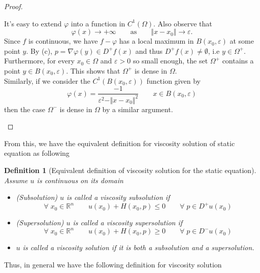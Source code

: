 \documentclass[12pt, oneside]{amsart}  	%
\newtheorem{definition}{Definition}
\begin{document}
\begin{proof}
\begin{itemize}
It's easy to extend $\varphi$ into a function in $C^1(\Omega)$. Also observe that 
\begin{equation*}
\varphi(x) \longrightarrow +\infty \qquad\text{as}\qquad \Vert x-x_0\Vert\longrightarrow \varepsilon.
\end{equation*}
Since $f$ is continuous, we have $f-\varphi$ has a local maximum in $B(x_0,\varepsilon)$ at some point $y$. By (c), $p = \nabla \varphi(y)\in D^+f(x)$ and thus $D^+f(x)\neq \emptyset$, i.e $y\in \Omega^+$. Furthermore, for every $x_0\in \Omega$ and $\varepsilon>0$ so small enough, the set $\Omega^+$ contains a point $y\in B(x_0,\varepsilon)$. This shows that $\Omega^+$ is dense in $\Omega$.\\
Similarly, if we consider the $C^1(B(x_0,\varepsilon))$ function given by
\begin{equation*}
\varphi(x) = \frac{-1}{\varepsilon^2 - \Vert x-x_0\Vert^2} \qquad x\in B(x_0,\varepsilon)
\end{equation*}
then the case $\Omega^-$ is dense in $\Omega$ by a similar argument.
\end{itemize}
\end{proof}
















From this, we have the equivalent definition for viscosity solution of static equation as following

\begin{definition} [Equivalent definition of viscosity solution for the static equation] Assume $u$ is continuous on its domain
\begin{itemize}
\item (Subsolution) $u$ is called a viscosity subsolution if
$$ \forall\;x_0\in \mathbb{R}^n\qquad  u(x_0) + H(x_0, p)\le 0 \qquad \forall\; p\in D^+u(x_0)$$
\item (Supersolution) $u$ is called a viscosity supersolution if $$ \forall\;x_0\in \mathbb{R}^n\qquad  u(x_0) + H(x_0, p)\ge 0 \qquad \forall\; p\in D^-u(x_0)$$
\item $u$ is called a viscosity solution if it is both a subsolution and a supersolution.
\end{itemize}
\end{definition}

Thus, in general we have the following definition for viscosity solution
\end{document}
